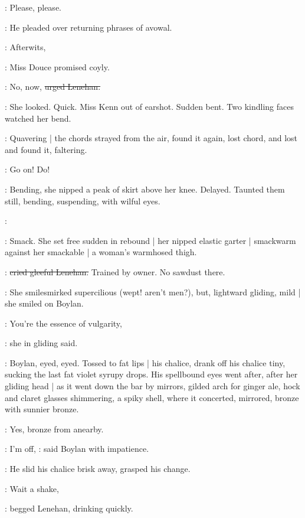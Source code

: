 \lenehan:
Please,
please.

:
He pleaded over returning phrases of avowal.


\MissD:
Afterwits,

:
Miss Douce promised coyly.

\lenehan:
No,
now,
\sout{urged Lenehan.}

:
She looked.
Quick.
Miss Kenn out of earshot.
Sudden bent.
Two kindling faces watched her bend.

:
Quavering |
the chords strayed from the air,
found it again,
lost chord,
and lost and found it,
faltering.

\lenehan:
Go on!
Do!

:
Bending,
she nipped a peak of skirt above her knee.
Delayed.
Taunted them still,
bending,
suspending,
with wilful eyes.

\lenehan:

:
Smack.
She set free sudden in rebound |
her nipped elastic garter |
smackwarm against her smackable |
a woman's warmhosed thigh.

\lenehan:
\sout{cried gleeful Lenehan.}
Trained by owner.
No sawdust there.

:
She smilesmirked supercilious
(wept!
aren't men?),
but,
lightward gliding,
mild |
she smiled on Boylan.

\MissD:
You're the essence of vulgarity,

:
she in gliding said.

:
Boylan,
eyed,
eyed.
Tossed to fat lips |
his chalice,
drank off his chalice tiny,
sucking the last fat violet syrupy drops.
His spellbound eyes went after,
after her gliding head |
as it went down the bar by mirrors,
gilded arch for ginger ale,
hock and claret glasses shimmering,
a spiky shell,
where it concerted,
mirrored,
bronze with sunnier bronze.

:
Yes,
bronze from anearby.


\boylan:
I'm off,
:
said Boylan with impatience.

:
He slid his chalice brisk away,
grasped his change.

\lenehan:
Wait a shake,

:
begged Lenehan,
drinking quickly.

